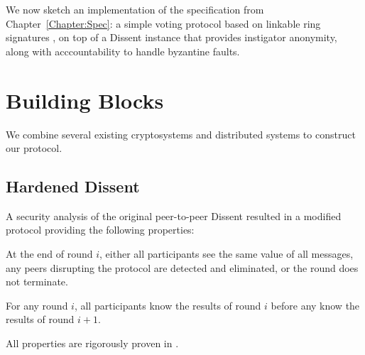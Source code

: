 We now sketch an implementation of the specification from
Chapter~\ref{Chapter:Spec}: a simple voting protocol based on linkable ring
signatures \cite{lrs}, on top of a Dissent instance that provides instigator
anonymity, along with acccountability to handle byzantine faults.
\section{Building Blocks}
We combine several existing cryptosystems and distributed systems to construct
our protocol.
\subsection{Hardened Dissent}
A security analysis of the original peer-to-peer Dissent resulted in a modified
protocol providing the following properties:
  \begin{theorem} At the end of round $i$, either all participants see the same
    value of all messages, any peers disrupting the protocol are detected and
    eliminated, or the round does not terminate.%
  \end{theorem}
  \begin{theorem} For any round $i$, all participants know the results of round
    $i$ before any know the results of round
    $i+1$.\end{theorem}\label{theorem:rounds}
  All properties are rigorously proven in \cite{sec}.

